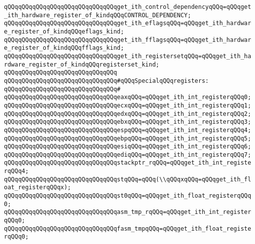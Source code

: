 \verb|qQQqqQQqqQQqqQQqqQQqqQQqqQQqqQQqget_ith_control_dependencyqQQq=qQQqget_ith_hardware_register_of_kindqQQqCONTROL_DEPENDENCY;|\newline
\verb|qQQqqQQqqQQqqQQqqQQqqQQqqQQqqQQqget_ith_eflagsqQQq=qQQqget_ith_hardware_register_of_kindqQQqeflags_kind;|\newline
\verb|qQQqqQQqqQQqqQQqqQQqqQQqqQQqqQQqget_ith_fflagsqQQq=qQQqget_ith_hardware_register_of_kindqQQqfflags_kind;|\newline
\verb|qQQqqQQqqQQqqQQqqQQqqQQqqQQqqQQqget_ith_registersetqQQq=qQQqget_ith_hardware_register_of_kindqQQqregisterset_kind;|\newline
\verb|qQQqqQQqqQQqqQQqqQQqqQQqqQQqqQQq|\newline
\verb|qQQqqQQqqQQqqQQqqQQqqQQqqQQqqQQq#qQQqSpecialqQQqregisters:|\newline
\verb|qQQqqQQqqQQqqQQqqQQqqQQqqQQqqQQq#|\newline
\verb|qQQqqQQqqQQqqQQqqQQqqQQqqQQqqQQqeaxqQQq=qQQqget_ith_int_registerqQQq0;|\newline
\verb|qQQqqQQqqQQqqQQqqQQqqQQqqQQqqQQqecxqQQq=qQQqget_ith_int_registerqQQq1;|\newline
\verb|qQQqqQQqqQQqqQQqqQQqqQQqqQQqqQQqedxqQQq=qQQqget_ith_int_registerqQQq2;|\newline
\verb|qQQqqQQqqQQqqQQqqQQqqQQqqQQqqQQqebxqQQq=qQQqget_ith_int_registerqQQq3;|\newline
\verb|qQQqqQQqqQQqqQQqqQQqqQQqqQQqqQQqespqQQq=qQQqget_ith_int_registerqQQq4;|\newline
\verb|qQQqqQQqqQQqqQQqqQQqqQQqqQQqqQQqebpqQQq=qQQqget_ith_int_registerqQQq5;|\newline
\verb|qQQqqQQqqQQqqQQqqQQqqQQqqQQqqQQqesiqQQq=qQQqget_ith_int_registerqQQq6;|\newline
\verb|qQQqqQQqqQQqqQQqqQQqqQQqqQQqqQQqediqQQq=qQQqget_ith_int_registerqQQq7;|\newline
\verb|qQQqqQQqqQQqqQQqqQQqqQQqqQQqqQQqstackptr_rqQQq=qQQqget_ith_int_registerqQQq4;|\newline
\verb|qQQqqQQqqQQqqQQqqQQqqQQqqQQqqQQqstqQQq=qQQq(\\qQQqxqQQq=qQQqget_ith_float_registerqQQqx);|\newline
\verb|qQQqqQQqqQQqqQQqqQQqqQQqqQQqqQQqst0qQQq=qQQqget_ith_float_registerqQQq0;|\newline
\verb|qQQqqQQqqQQqqQQqqQQqqQQqqQQqqQQqasm_tmp_rqQQq=qQQqget_ith_int_registerqQQq0;|\newline
\verb|qQQqqQQqqQQqqQQqqQQqqQQqqQQqqQQqfasm_tmpqQQq=qQQqget_ith_float_registerqQQq0;|\newline
